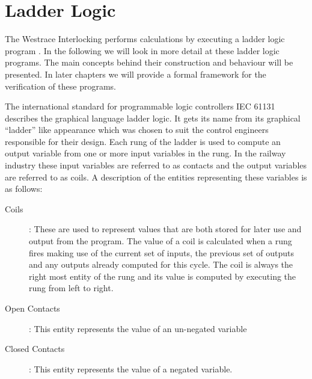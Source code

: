 \section{Ladder Logic}

The Westrace Interlocking performs calculations by executing a ladder logic
program \cite{IEC03}. In the following we will look in more detail at these
ladder logic programs. The main concepts behind their construction and
behaviour will be presented. In later chapters we will provide a formal framework
for the verification of these programs.

The international standard for programmable logic controllers IEC
61131 \cite{IEC03} describes the graphical language ladder logic. It gets its
name from its graphical ``ladder'' like appearance which was chosen to suit
the control engineers responsible for their design. Each rung of the ladder is
used to compute an output variable from one or more input variables in the rung.
In the railway industry these input variables are referred to as contacts and
the output variables are referred to as coils. A description of the entities representing these variables
is as follows:


\smallskip

\begin{description}

\item[Coils]: These are used to represent values that are both stored for later use
  and output from the program. The value of a coil is calculated when a rung
  fires making use of the current set of inputs, the previous set of outputs
  and any outputs already computed for this cycle. The coil is always the
  right most entity of the rung and its value is computed by executing the
  rung from left to right.


\item[Open Contacts]: This entity represents the value of an un-negated variable


\item[Closed Contacts]: This entity represents the value of a negated variable.

\end{description}

\medskip

